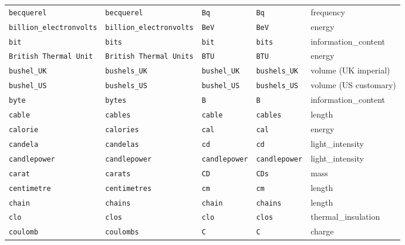 \begin{landscape}
\begin{center}
\begin{longtable}{|lllll|}
{\tt\footnotesize becquerel} & {\tt\footnotesize becquerel} & {\tt\footnotesize Bq} & {\tt\footnotesize Bq} & frequency \\
{\tt\footnotesize billion\_electronvolts} & {\tt\footnotesize billion\_electronvolts} & {\tt\footnotesize BeV} & {\tt\footnotesize BeV} & energy \\
{\tt\footnotesize bit} & {\tt\footnotesize bits} & {\tt\footnotesize bit} & {\tt\footnotesize bits} & information\_content \\
{\tt\footnotesize British Thermal Unit} & {\tt\footnotesize British Thermal Units} & {\tt\footnotesize BTU} & {\tt\footnotesize BTU} & energy \\
{\tt\footnotesize bushel\_UK} & {\tt\footnotesize bushels\_UK} & {\tt\footnotesize bushel\_UK} & {\tt\footnotesize bushels\_UK} & volume (UK imperial) \\
{\tt\footnotesize bushel\_US} & {\tt\footnotesize bushels\_US} & {\tt\footnotesize bushel\_US} & {\tt\footnotesize bushels\_US} & volume (US customary) \\
{\tt\footnotesize byte} & {\tt\footnotesize bytes} & {\tt\footnotesize B} & {\tt\footnotesize B} & information\_content \\
{\tt\footnotesize cable} & {\tt\footnotesize cables} & {\tt\footnotesize cable} & {\tt\footnotesize cables} & length \\
{\tt\footnotesize calorie} & {\tt\footnotesize calories} & {\tt\footnotesize cal} & {\tt\footnotesize cal} & energy \\
{\tt\footnotesize candela} & {\tt\footnotesize candelas} & {\tt\footnotesize cd} & {\tt\footnotesize cd} & light\_intensity \\
{\tt\footnotesize candlepower} & {\tt\footnotesize candlepower} & {\tt\footnotesize candlepower} & {\tt\footnotesize candlepower} & light\_intensity \\
{\tt\footnotesize carat} & {\tt\footnotesize carats} & {\tt\footnotesize CD} & {\tt\footnotesize CDs} & mass \\
{\tt\footnotesize centimetre} & {\tt\footnotesize centimetres} & {\tt\footnotesize cm} & {\tt\footnotesize cm} & length \\
{\tt\footnotesize chain} & {\tt\footnotesize chains} & {\tt\footnotesize chain} & {\tt\footnotesize chains} & length \\
{\tt\footnotesize clo} & {\tt\footnotesize clos} & {\tt\footnotesize clo} & {\tt\footnotesize clos} & thermal\_insulation \\
{\tt\footnotesize coulomb} & {\tt\footnotesize coulombs} & {\tt\footnotesize C} & {\tt\footnotesize C} & charge \\

\end{longtable}
\end{center}
\end{landscape}

